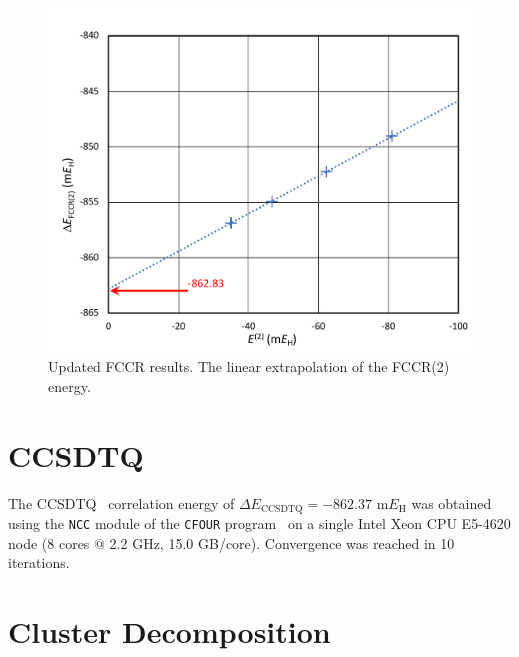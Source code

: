\documentclass[journal=jcp,manuscript=suppinfo]{achemso}
\begin{document}
%
\begin{figure}[ht!]
\begin{center}
\includegraphics[scale=0.6]{figures/fccr/fccr.pdf}
\caption{Updated FCCR results. The linear extrapolation of the FCCR(2) energy.}
\label{fccr_updated_SI_fig}
\end{center}
\vspace{-0.6cm}
\end{figure}
%

\section{CCSDTQ}

The CCSDTQ~\cite{ccsdtq_paper_1_jcp_1991,ccsdtq_paper_2_jcp_1992} correlation energy of $\Delta E_{\text{CCSDTQ}} = -862.37$ m$E_{\text{H}}$ was obtained using the {\texttt{NCC}} module of the {\texttt{CFOUR}} program~\cite{matthews_stanton_ccsdtq_jcp_2015,ncc,cfour_paper,cfour} on a single Intel Xeon CPU E5-4620 node (8 cores $@$ 2.2 GHz, 15.0 GB/core). Convergence was reached in 10 iterations.

\section{Cluster Decomposition}
\end{document}
